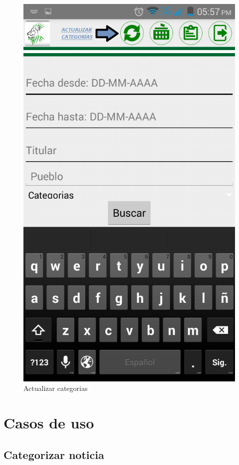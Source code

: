 \begin{figure}
\centering
\includegraphics[scale=0.5]{./android/imagenes/botones4.png}
\caption{Actualizar categorias}
\label{boton3}
\end{figure}

\section{Casos de uso}
\subsection{Categorizar noticia}


